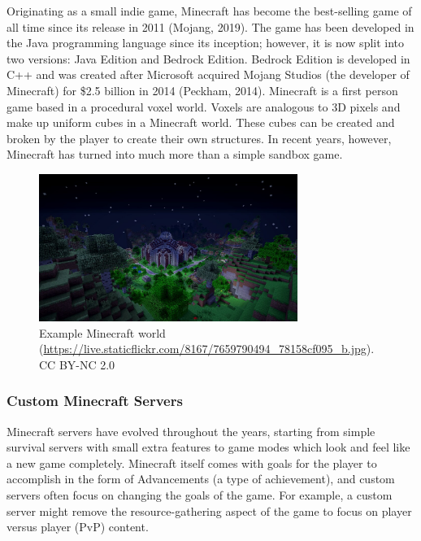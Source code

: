 \documentclass{article}
\begin{document}
\begin{onehalfspacing}
Originating as a small indie game, Minecraft has become the best-selling
game of all time since its release in 2011 \parencite{mojang2019}(Mojang, 2019). The game has
been developed in the Java programming language since its inception;
however, it is now split into two versions: Java Edition and Bedrock
Edition. Bedrock Edition is developed in C++ and was created after
Microsoft acquired Mojang Studios (the developer of Minecraft) for \$2.5
billion in 2014 \parencite{peckham2014}(Peckham, 2014). Minecraft is a first person game based
in a procedural voxel world. Voxels are analogous to 3D pixels and make
up uniform cubes in a Minecraft world. These cubes can be created and
broken by the player to create their own structures. In recent years,
however, Minecraft has turned into much more than a simple sandbox game.



\begin{figure}[h] 
    \centering
    \includegraphics[width=0.75\textwidth]{media/media/image2.jpg} 
    \caption{Example Minecraft world \\ (\href{https://live.staticflickr.com/8167/7659790494_78158cf095_b.jpg}{{https://live.staticflickr.com/8167/7659790494\_78158cf095\_b.jpg}}). CC BY-NC 2.0} 
    \label{fig:2_4_1} 
\end{figure}

\subsubsection{Custom Minecraft Servers}

Minecraft servers have evolved throughout the years, starting from
simple survival servers with small extra features to game modes which
look and feel like a new game completely. Minecraft itself comes with
goals for the player to accomplish in the form of Advancements (a type
of achievement), and custom servers often focus on changing the goals of
the game. For example, a custom server might remove the
resource-gathering aspect of the game to focus on player versus player
(PvP) content.


\end{onehalfspacing}
\end{document}
